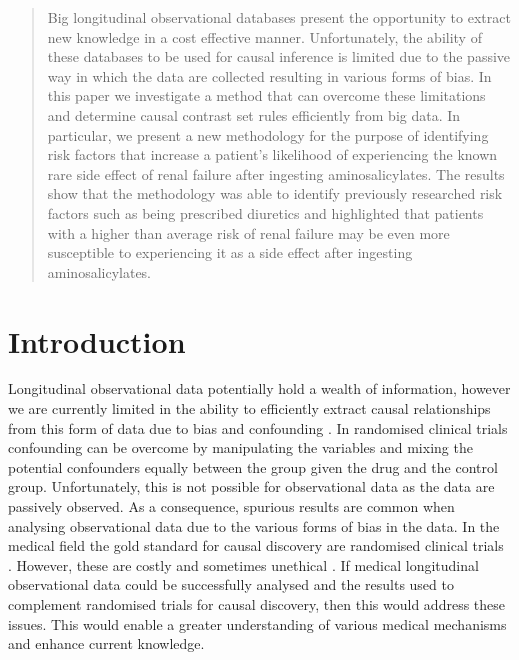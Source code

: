 \documentclass{llncs}
\begin{document}
\begin{abstract}
Big longitudinal observational databases present the opportunity to extract new knowledge in a cost effective manner. Unfortunately, the ability of these databases to be used for causal inference is limited due to the passive way in which the data are collected resulting in various forms of bias. In this paper we investigate a method that can overcome these limitations and determine causal contrast set rules efficiently from big data. In particular, we present a new methodology for the purpose of identifying risk factors that increase a patient’s likelihood of experiencing the known rare side effect of renal failure after ingesting aminosalicylates. The results show that the methodology was able to identify previously researched risk factors such as being prescribed diuretics and highlighted that patients with a higher than average risk of renal failure may be even more susceptible to experiencing it as a side effect after ingesting aminosalicylates.

\end{abstract}

\section{Introduction}
Longitudinal observational data potentially hold a wealth of information, however we are currently limited in the ability to efficiently extract causal relationships from this form of data due to bias and confounding \cite{giordano2008limits}. In randomised clinical trials confounding can be overcome by manipulating the variables and mixing the potential confounders equally between the group given the drug and the control group. Unfortunately, this is not possible for observational data as the data are passively observed. As a consequence, spurious results are common when analysing observational data due to the various forms of bias in the data. In the medical field the gold standard for causal discovery are randomised clinical trials \cite{cochran1973controlling}. However, these are costly and sometimes unethical \cite{black1996we}. If medical longitudinal observational data could be successfully analysed and the results used to complement randomised trials for causal discovery, then this would address these issues. This would enable a greater understanding of various medical mechanisms and enhance current knowledge. 
\end{document}
